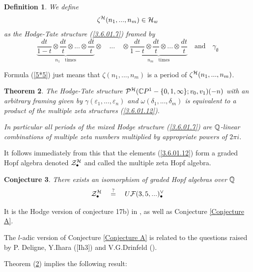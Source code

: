 \documentclass[10pt]{article}
\newtheorem{theorem}{Theorem}[section]
\newtheorem{conjecture}[theorem]{Conjecture}
\newtheorem{definition}[theorem]{Definition}
\begin{document}
\begin{definition} \label{3.6.01.2} We define 
\begin{equation} \label{3.6.01.12}
\zeta^{\cal H}(n_1, ..., n_m) \in {\cal H}_{w}
\end{equation}
as  the 
Hodge-Tate structure (\ref{3.6.01.7}) framed by 
\begin{equation} \label{3.6.01.5}
\underbrace {\frac{dt}{1-t}  \otimes \frac{dt}{t} \otimes
... \otimes
\frac{dt}{t} }
_{ n_{1} \quad  \mbox {times}} \otimes \quad
... \quad \otimes \underbrace 
{\frac{dt}{1-t} \otimes \frac{dt}{t} \otimes ...
\otimes \frac{dt}{t}}_{ n_{m} \quad \mbox  {times}} \quad \mbox{and} \quad \gamma_{\emptyset}
\end{equation}
\end{definition}

Formula (\ref{5*5}) just means that $\zeta(n_1, ..., n_m)$ is a period of 
$\zeta^{\cal H}(n_1, ..., n_m)$.


\begin{theorem} \label{3.6.01.3} The Hodge-Tate structure 
${\cal P}^{\cal H}({\mathbb C} P^1 - \{0, 1, \infty\}; v_0, v_1)(-n)$ with an arbitrary framing given 
by 
$\gamma(\varepsilon_1, ...,\varepsilon_n)$ and $\omega(\delta_1, ..., \delta_m) $
is equivalent to a product of the multiple zeta 
structures (\ref{3.6.01.12}). 

In particular all periods of the mixed Hodge structure (\ref{3.6.01.7}) are  ${\mathbb Q}$-linear 
combinations 
of multiple zeta numbers multiplied by appropriate powers of $2\pi i$. 
\end{theorem}

It follows immediately from this that the elements (\ref{3.6.01.12}) form a 
graded Hopf algebra denoted ${\cal Z}^{\cal H}_{\bullet}$ and called the multiple zeta 
Hopf algebra.  


\begin{conjecture} \label{1.3} There exists  an isomorphism of graded 
Hopf algebras over ${\mathbb Q}$
$$
{{\cal Z}}^{\cal H}_{\bullet} \quad \stackrel{?}{=}\quad  U{\cal F}(3,5, ... )_{\bullet}^{\vee}
$$
\end{conjecture}
It is the Hodge version of conjecture 17b) in \cite{G1}, as well as   
Conjecture \ref{Conjecture A}. 


The  $l$-adic version of Conjecture \ref{Conjecture A} is related to the 
questions raised by P. Deligne, Y.Ihara
([Ih3]) and V.G.Drinfeld (\cite{Dr}). 

Theorem (\ref{3.6.01.3}) implies the following result:
\end{document}
